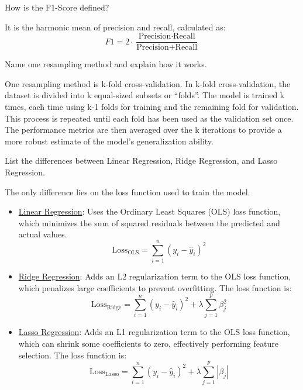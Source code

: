 \documentclass[12pt]{article}
\begin{document}
    \begin{ejercicio}
        How is the F1-Score defined?

        It is the harmonic mean of precision and recall, calculated as:
        \[ F1 = 2 \cdot \frac{\text{Precision} \cdot \text{Recall}}{\text{Precision} + \text{Recall}} \]
    \end{ejercicio}

    \begin{ejercicio}
        Name one resampling method and explain how it works.

        One resampling method is k-fold cross-validation. In k-fold cross-validation, the dataset is divided into k equal-sized subsets or ``folds''. The model is trained k times, each time using k-1 folds for training and the remaining fold for validation. This process is repeated until each fold has been used as the validation set once. The performance metrics are then averaged over the k iterations to provide a more robust estimate of the model's generalization ability.
    \end{ejercicio}

    \begin{ejercicio}
        List the differences between Linear Regression, Ridge Regression, and Lasso Regression.

        The only difference lies on the loss function used to train the model.
        \begin{itemize}
            \item \ul{Linear Regression}: Uses the Ordinary Least Squares (OLS) loss function, which minimizes the sum of squared residuals between the predicted and actual values.
            \begin{equation*}
                \text{Loss}_{\text{OLS}} = \sum_{i=1}^{n} (y_i - \hat{y}_i)^2
            \end{equation*}

            \item \ul{Ridge Regression}: Adds an L2 regularization term to the OLS loss function, which penalizes large coefficients to prevent overfitting. The loss function is:
            \begin{equation*}
                \text{Loss}_{\text{Ridge}} = \sum_{i=1}^{n} (y_i - \hat{y}_i)^2 + \lambda \sum_{j=1}^{p} \beta_j^2
            \end{equation*}

            \item \ul{Lasso Regression}: Adds an L1 regularization term to the OLS loss function, which can shrink some coefficients to zero, effectively performing feature selection. The loss function is:
            \begin{equation*}
                \text{Loss}_{\text{Lasso}} = \sum_{i=1}^{n} (y_i - \hat{y}_i)^2 + \lambda \sum_{j=1}^{p} |\beta_j|
            \end{equation*}
        \end{itemize}
    \end{ejercicio}
\end{document}
